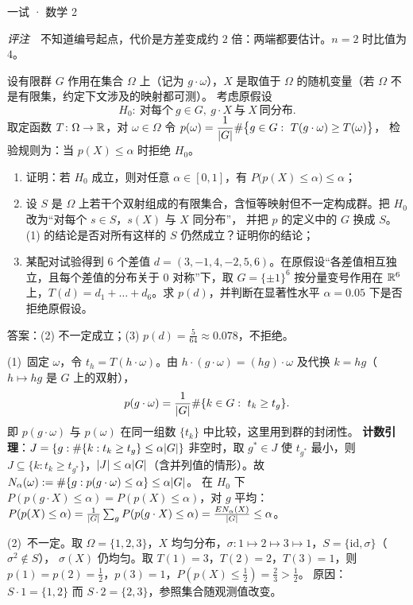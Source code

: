 \documentclass[cjk=noto, seal=first]{mojing-exam}
\begin{document}
\begin{paper}[time={建议 3 小时（训练设置）}, full=150]{一试 · 数学 2}
\begin{questions}
\begin{solution}
\emph{评注}　不知道编号起点，代价是方差变成约 $2$ 倍：两端都要估计。$n=2$ 时比值为 $4$。
\end{solution}

\question[25]
设有限群 $G$ 作用在集合 $\Omega$ 上（记为 $g\cdot\omega$），$X$ 是取值于 $\Omega$ 的随机变量（若 $\Omega$ 不是有限集，约定下文涉及的映射都可测）。
考虑原假设
\[
  H_0:\ \text{对每个}\ g\in G,\ g\cdot X\ \text{与}\ X\ \text{同分布}.
\]
取定函数 $T\colon\Omega\to\mathbb{R}$，对 $\omega\in\Omega$ 令 $p(\omega)=\dfrac1{\abs G}\#\bigl\{g\in G:\ T(g\cdot\omega)\ge T(\omega)\bigr\}$，
检验规则为：当 $p(X)\le\alpha$ 时拒绝 $H_0$。
\begin{enumerate}
  \item 证明：若 $H_0$ 成立，则对任意 $\alpha\in[0,1]$，有 $P\bigl(p(X)\le\alpha\bigr)\le\alpha$；
  \item 设 $S$ 是 $\Omega$ 上若干个双射组成的有限集合，含恒等映射但不一定构成群。把 $H_0$ 改为“对每个 $s\in S$，$s(X)$ 与 $X$ 同分布”，
        并把 $p$ 的定义中的 $G$ 换成 $S$。(1) 的结论是否对所有这样的 $S$ 仍然成立？证明你的结论；
  \item 某配对试验得到 $6$ 个差值 $d=(3,-1,4,-2,5,6)$。在原假设“各差值相互独立，且每个差值的分布关于 $0$ 对称”下，取
        $G=\{\pm1\}^6$ 按分量变号作用在 $\mathbb{R}^6$ 上，$T(d)=d_1+\dots+d_6$。求 $p(d)$，并判断在显著性水平 $\alpha=0.05$ 下是否拒绝原假设。
\end{enumerate}
\answerspace{2cm}
\begin{solution}
答案：(2) 不一定成立；(3) $p(d)=\frac5{64}\approx0.078$，不拒绝。

(1)~固定 $\omega$，令 $t_h=T(h\cdot\omega)$。由 $h\cdot(g\cdot\omega)=(hg)\cdot\omega$ 及代换 $k=hg$（$h\mapsto hg$ 是 $G$ 上的双射），
\[
  p(g\cdot\omega)=\frac1{\lvert G\rvert}\#\{k\in G:\ t_k\ge t_g\}.
\]
即 $p(g\cdot\omega)$ 与 $p(\omega)$ 在同一组数 $\{t_k\}$ 中比较，这里用到群的封闭性。
\textbf{计数引理}：$J=\{g:\#\{k:t_k\ge t_g\}\le\alpha\lvert G\rvert\}$ 非空时，取 $g^*\in J$ 使 $t_{g^*}$ 最小，则
$J\subseteq\{k:t_k\ge t_{g^*}\}$，$\lvert J\rvert\le\alpha\lvert G\rvert$（含并列值的情形）。故 $N_\alpha(\omega):=\#\{g:p(g\cdot\omega)\le\alpha\}\le\alpha\lvert G\rvert$。
在 $H_0$ 下 $P(p(g\cdot X)\le\alpha)=P(p(X)\le\alpha)$，对 $g$ 平均：
$P(p(X)\le\alpha)=\frac1{\lvert G\rvert}\sum_gP(p(g\cdot X)\le\alpha)=\frac{E N_\alpha(X)}{\lvert G\rvert}\le\alpha$。

(2)~不一定。取 $\Omega=\{1,2,3\}$，$X$ 均匀分布，$\sigma\colon1\mapsto2\mapsto3\mapsto1$，$S=\{\mathrm{id},\sigma\}$（$\sigma^2\notin S$），
$\sigma(X)$ 仍均匀。取 $T(1)=3$，$T(2)=2$，$T(3)=1$，则 $p(1)=p(2)=\frac12$，$p(3)=1$，$P(p(X)\le\frac12)=\frac23>\frac12$。
原因：$S\cdot1=\{1,2\}$ 而 $S\cdot2=\{2,3\}$，参照集合随观测值改变。


\end{solution}
\end{questions}
\end{paper}
\end{document}
